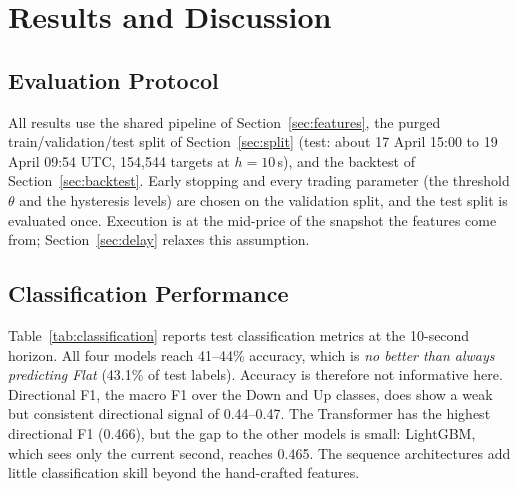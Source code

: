 
\section{Results and Discussion}
\label{sec:results}

\subsection{Evaluation Protocol}
\label{sec:protocol}

All results use the shared pipeline of Section~\ref{sec:features}, the purged
train/validation/test split of Section~\ref{sec:split} (test: about 17 April 15:00 to
19 April 09:54 UTC, 154,544 targets at $h=10$\,s), and the backtest of
Section~\ref{sec:backtest}. Early stopping and every trading parameter (the threshold $\theta$
and the hysteresis levels) are chosen on the validation split, and the test split is
evaluated once. Execution is at the mid-price of the snapshot the features come from;
Section~\ref{sec:delay} relaxes this assumption.

\subsection{Classification Performance}
\label{sec:classification}

Table~\ref{tab:classification} reports test classification metrics at the 10-second
horizon. All four models reach 41--44\% accuracy, which is \emph{no better than always
predicting Flat} (43.1\% of test labels). Accuracy is therefore not informative here.
Directional F1, the macro F1 over the Down and Up classes, does show a weak but
consistent directional signal of 0.44--0.47. The Transformer has the highest directional
F1 (0.466), but the gap to the other models is small: LightGBM, which sees only the
current second, reaches 0.465. The sequence architectures add little classification
skill beyond the hand-crafted features.

